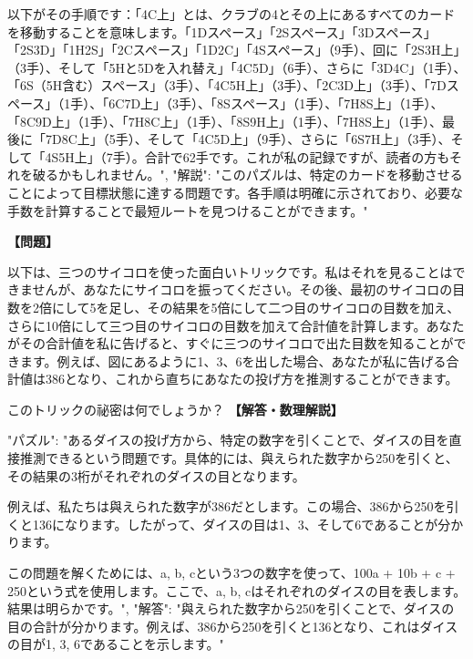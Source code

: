 \documentclass[10pt,a4paper,oneside,openany]{ltjsbook}
\begin{document}
\begin{tcolorbox}[colback=softblue,colframe=primaryblue,title=\textbf{第 385 問："STRAND" PATIENCE.},arc=2mm,boxrule=1pt,breakable]
{以下がその手順です：「4C上」とは、クラブの4とその上にあるすべてのカードを移動することを意味します。「1Dスペース」「2Sスペース」「3Dスペース」「2S3D」「1H2S」「2Cスペース」「1D2C」「4Sスペース」（9手）、回に「2S3H上」（3手）、そして「5Hと5Dを入れ替え」「4C5D」（6手）、さらに「3D4C」（1手）、「6S（5H含む）スペース」（3手）、「4C5H上」（3手）、「2C3D上」（3手）、「7Dスペース」（1手）、「6C7D上」（3手）、「8Sスペース」（1手）、「7H8S上」（1手）、「8C9D上」（1手）、「7H8C上」（1手）、「8S9H上」（1手）、「7H8S上」（1手）、最後に「7D8C上」（5手）、そして「4C5D上」（9手）、さらに「6S7H上」（3手）、そして「4S5H上」（7手）。合計で62手です。これが私の記録ですが、読者の方もそれを破るかもしれません。",
"解説": "このパズルは、特定のカードを移動させることによって目標狀態に達する問題です。各手順は明確に示されており、必要な手数を計算することで最短ルートを見つけることができます。"
}
\end{tcolorbox}

\begin{tcolorbox}[colback=softblue,colframe=primaryblue,title=\textbf{第 386 問：A TRICK WITH DICE.},arc=2mm,boxrule=1pt,breakable]
\textbf{【問題】}\par\vspace{0.3em}
以下は、三つのサイコロを使った面白いトリックです。私はそれを見ることはできませんが、あなたにサイコロを振ってください。その後、最初のサイコロの目数を2倍にして5を足し、その結果を5倍にして二つ目のサイコロの目数を加え、さらに10倍にして三つ目のサイコロの目数を加えて合計値を計算します。あなたがその合計値を私に告げると、すぐに三つのサイコロで出た目数を知ることができます。例えば、図にあるように1、3、6を出した場合、あなたが私に告げる合計値は386となり、これから直ちにあなたの投げ方を推測することができます。

このトリックの祕密は何でしょうか？
\tcblower
\textbf{【解答・数理解説】}\par\vspace{0.3em}
{
"パズル": "あるダイスの投げ方から、特定の数字を引くことで、ダイスの目を直接推測できるという問題です。具体的には、與えられた数字から250を引くと、その結果の3桁がそれぞれのダイスの目となります。

例えば、私たちは與えられた数字が386だとします。この場合、386から250を引くと136になります。したがって、ダイスの目は1、3、そして6であることが分かります。

この問題を解くためには、a, b, cという3つの数字を使って、100a + 10b + c + 250という式を使用します。ここで、a, b, cはそれぞれのダイスの目を表します。結果は明らかです。",
"解答": "與えられた数字から250を引くことで、ダイスの目の合計が分かります。例えば、386から250を引くと136となり、これはダイスの目が1, 3, 6であることを示します。"
}
\end{tcolorbox}
\end{document}
